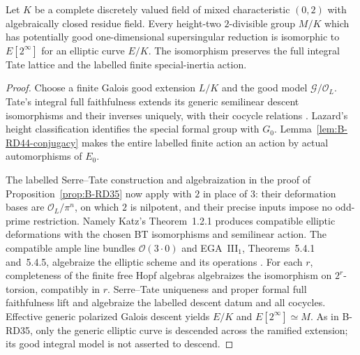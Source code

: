 \begin{proposition}
\label{prop:B-RD44-realization}
Let $K$ be a complete discretely valued field of mixed characteristic
$(0,2)$ with algebraically closed residue field. Every height-two
$2$-divisible group $M/K$ which has potentially good one-dimensional
supersingular reduction is isomorphic to $E[2^\infty]$ for an
elliptic curve $E/K$. The isomorphism preserves the full integral
Tate lattice and the labelled finite special-inertia action.
\end{proposition}
\begin{proof}
Choose a finite Galois good extension $L/K$ and the good model
$\mathcal G/\mathcal O_L$. Tate's integral full faithfulness
extends its generic semilinear descent isomorphisms and their
inverses uniquely, with their cocycle relations
\cite[Theorem~4 and Corollaries~1--2, p.~181]{Tate1967PDivisible}.
Lazard's height classification
\cite[Theorem~IV and proof, pp.~270--271]{Lazard1955Formal}
identifies the special formal group with $G_0$.
Lemma~\ref{lem:B-RD44-conjugacy} makes the entire labelled finite
action an action by actual automorphisms of $E_0$.

The labelled Serre--Tate construction and algebraization in the
proof of Proposition~\ref{prop:B-RD35} now apply with $2$ in place
of $3$: their deformation bases are $\mathcal O_L/\pi^n$, on
which $2$ is nilpotent, and their precise inputs impose no
odd-prime restriction. Namely Katz's Theorem~1.2.1
\cite[p.~143 and proof pp.~143--146]{Katz1981SerreTate}
produces compatible elliptic deformations with the chosen BT
isomorphisms and semilinear action. The compatible ample line
bundles $\mathcal O(3\cdot0)$ and EGA~III$_1$, Theorems~5.4.1
and~5.4.5, algebraize the elliptic scheme and its operations
\cite[pp.~156--158]{EGAIII1}.
For each $r$, completeness of the finite free Hopf algebras
algebraizes the isomorphism on $2^r$-torsion, compatibly in $r$.
Serre--Tate uniqueness and proper formal full faithfulness lift
and algebraize the labelled descent datum and all cocycles.
Effective generic polarized Galois descent yields $E/K$ and
$E[2^\infty]\simeq M$. As in B-RD35, only the generic elliptic
curve is descended across the ramified extension; its good
integral model is not asserted to descend.
\end{proof}

